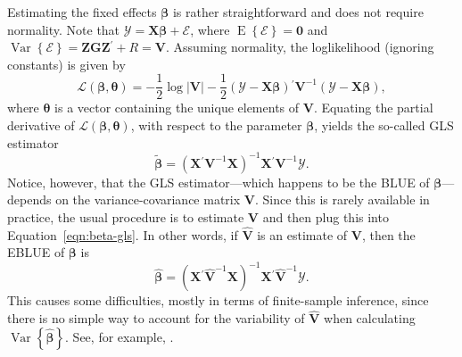 \documentclass[cmfont,usenames,dvipsnames,leqno]{afit-etd}\usepackage[]{graphicx}\usepackage[]{color}
\newcommand{\loglik}{\mathscr{L}}
\newcommand{\trans}{\ensuremath{^\prime}}
\newcommand{\bc}[1]{\ensuremath{\bm{\mathcal{#1}}}}
\newcommand{\mc}[1]{\ensuremath{\mathcal{#1}}}
\newcommand{\wh}[1]{\ensuremath{\widehat{#1}}}
\newcommand{\wt}[1]{\ensuremath{\widetilde{#1}}}
\newcommand{\E}{\operatorname{E}}
\newcommand{\var}{\operatorname{Var}}
\newcommand{\X}{\ensuremath{\bm{X}}}
\newcommand{\Z}{\ensuremath{\bm{Z}}}
\begin{document}
Estimating the fixed effects $\bm{\beta}$ is rather straightforward and does not require normality. Note that $\bc{Y} = \X\bm{\beta} + \bm{\mc{E}}$, where $\E\left\{\bm{\mc{E}}\right\} = \bm{0}$ and $\var\left\{\bm{\mc{E}}\right\} = \Z\bm{G}\Z\trans + R = \bm{V}$. Assuming normality, the loglikelihood (ignoring constants) is given by
\begin{equation}
\label{eqn:lmm-loglik-long}
  \loglik\left(\bm{\beta}, \bm{\theta}\right) = -\frac{1}{2}\log\left|\bm{V}\right| - \frac{1}{2}\left(\bc{Y} - \X\bm{\beta}\right)\trans\bm{V}^{-1}\left(\bc{Y} - \X\bm{\beta}\right),
\end{equation}
where $\bm{\theta}$ is a vector containing the unique elements of $\bm{V}$. Equating the partial derivative of $\loglik\left(\bm{\beta}, \bm{\theta}\right)$, with respect to the parameter $\bm{\beta}$, yields the so-called \ac{GLS} estimator
\begin{equation}
\label{eqn:beta-gls}
  \wt{\bm{\beta}} = \left(\X\trans\bm{V}^{-1}\X\right)^{-1}\X\trans\bm{V}^{-1}\bc{Y}.
\end{equation}
Notice, however, that the \ac{GLS} estimator---which happens to be the \ac{BLUE} of $\bm{\beta}$---depends on the variance-covariance matrix $\bm{V}$. Since this is rarely available in practice, the usual procedure is to estimate $\bm{V}$ and then plug this into Equation~\eqref{eqn:beta-gls}. In other words, if $\widehat{\bm{V}}$ is an estimate of $\bm{V}$, then the \ac{EBLUE} of $\bm{\beta}$ is 
\begin{equation}
\label{eqn:beta-egls}
  \wh{\bm{\beta}} = \left(\X\trans\widehat{\bm{V}}^{-1}\X\right)^{-1}\X\trans\widehat{\bm{V}}^{-1}\bc{Y}.
\end{equation}
This causes some difficulties, mostly in terms of finite-sample inference, since there is no simple way to account for the variability of $\widehat{\bm{V}}$ when calculating $\var\left\{\wh{\bm{\beta}}\right\}$. See, for example, \citet[pp. 165-167]{mcculloch_generalized_2008}.
\end{document}
